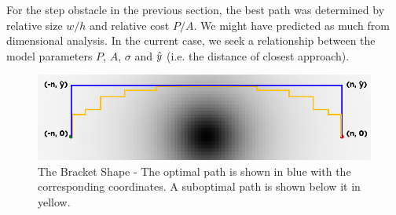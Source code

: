 For the step obstacle in the previous section, the best path was determined by relative size $w/h$ and relative cost $P/A$. We might have predicted as much from dimensional analysis. In the current case, we seek a relationship between the model parameters $P$, $A$, $\sigma$ and $\hat{y}$ (i.e. the distance of closest approach).

\begin{figure}
\includegraphics[width=\columnwidth]{graphix/bracket.png}
\caption{The Bracket Shape - The optimal path is shown in blue with the corresponding coordinates. A suboptimal path is shown below it in yellow. }
\label{fig:bracket}
\end{figure}
